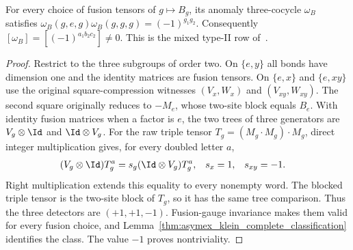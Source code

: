 \begin{lemma}
    \label{lem:asymex_z2z2_blocked_anomaly}
    \leanok
    For every choice of fusion tensors of $g\mapsto B_g$, its anomaly
    three-cocycle $\omega_B$ satisfies
    $\omega_B(g,e,g)\omega_B(g,g,g)=(-1)^{g_1g_2}$.
    Consequently $[\omega_B]=[(-1)^{a_1b_2c_2}]\neq0$.
    This is the mixed type-II row of~\cite{GarreRubio2023MPOSym}.
\end{lemma}

\begin{proof}
    \leanok
    Restrict to the three subgroups of order two. On $\{e,y\}$ all
    bonds have dimension one and the identity matrices are fusion tensors.
    On $\{e,x\}$ and $\{e,xy\}$ use the original square-compression
    witnesses $(V_x,W_x)$ and $(V_{xy},W_{xy})$. The second square
    originally reduces to $-M_e$, whose two-site block equals $B_e$.
    With identity fusion matrices when a factor is $e$, the two trees of
    three generators are $V_g\otimes\Id$ and $\Id\otimes V_g$.
    For the raw triple tensor $T_g=(M_g\cdot M_g)\cdot M_g$,
    direct integer multiplication gives, for every doubled letter $a$,
    \begin{align}
        (V_g\otimes\Id)T_g^a
               & =s_g(\Id\otimes V_g)T_g^a, &
        s_x    & =1,                        &
        s_{xy} & =-1.
        \label{eq:asymex_z2z2_raw_tree_comparison}
    \end{align}
    Right multiplication extends this equality
    to every nonempty word. The blocked triple tensor is the two-site
    block of $T_g$, so it has the same tree comparison. Thus the three
    detectors are $(+1,+1,-1)$. Fusion-gauge invariance makes them valid
    for every fusion choice, and
    Lemma~\ref{thm:asymex_klein_complete_classification} identifies the
    class. The value $-1$ proves nontriviality.
\end{proof}

